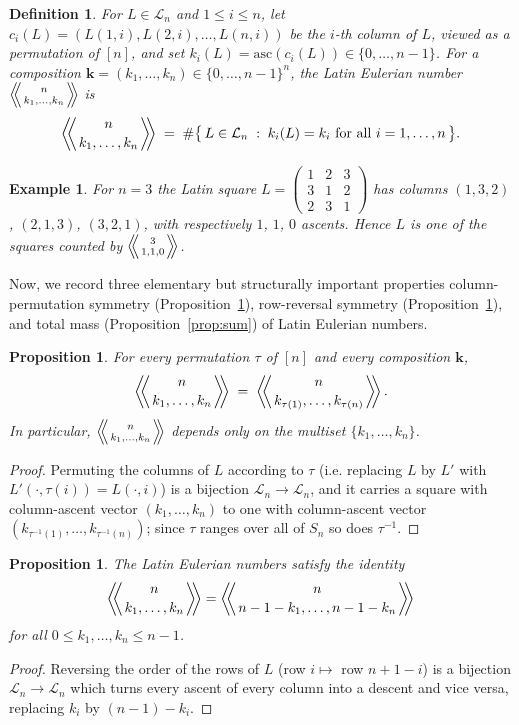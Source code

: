 \documentclass[11pt]{amsart}
\newtheorem{proposition}[theorem]{Proposition}
\newtheorem{definition}[theorem]{Definition}
\newtheorem{example}[theorem]{Example}
\newcommand{\LE}[1]{\left\langle\!\!\left\langle #1 \right\rangle\!\!\right\rangle}
\begin{document}
\begin{definition}\label{def:main}
For $L\in\mathcal L_n$ and $1\le i\le n$, let $c_i(L)=(L(1,i),L(2,i),\dots,L(n,i))$ be the $i$-th column of $L$, viewed as a permutation of $[n]$, and set $k_i(L)=\mathrm{asc}(c_i(L))\in\{0,\dots,n-1\}$. For a composition $\mathbf k=(k_1,\dots,k_n)\in\{0,\dots,n-1\}^n$, the \emph{Latin Eulerian number} $\LE{n\atop k_1,\dots,k_n}$ is
\[
\LE{n\atop k_1,\dots,k_n} \;=\; \#\bigl\{\,L\in\mathcal L_n \;:\; k_i(L)=k_i \text{ for all } i=1,\dots,n \,\bigr\}.
\]
\end{definition}

\begin{example}\label{ex:311}
For $n=3$ the Latin square $L=\begin{pmatrix}1&2&3\\3&1&2\\2&3&1\end{pmatrix}$
has columns $(1,3,2)$, $(2,1,3)$, $(3,2,1)$, with respectively $1$, $1$, $0$ ascents. Hence $L$ is one of the squares counted by $\LE{3\atop 1,1,0}$.
\end{example}
Now, we record three elementary but structurally important properties column-permutation symmetry (Proposition~\ref{prop:perm}), row-reversal symmetry (Proposition~\ref{prop:rev}), and total mass (Proposition~\ref{prop:sum}) of Latin Eulerian numbers. 
\begin{proposition}\label{prop:perm}
For every permutation $\tau$ of $[n]$ and every composition $\mathbf k$,
\[
\LE{n\atop k_1,\dots,k_n} \;=\; \LE{n\atop k_{\tau(1)},\dots,k_{\tau(n)}}.
\]
In particular, $\LE{n\atop k_1,\dots,k_n}$ depends only on the multiset $\{k_1,\dots,k_n\}$.
\end{proposition}
\begin{proof}
Permuting the columns of $L$ according to $\tau$ (i.e. replacing $L$ by $L'$ with $L'(\cdot,\tau(i))=L(\cdot,i)$) is a bijection $\mathcal L_n\to\mathcal L_n$, and it carries a square with column-ascent vector $(k_1,\dots,k_n)$ to one with column-ascent vector $(k_{\tau^{-1}(1)},\dots,k_{\tau^{-1}(n)})$; since $\tau$ ranges over all of $S_n$ so does $\tau^{-1}$.
\end{proof}

\begin{proposition}\label{prop:rev}
The Latin Eulerian numbers satisfy the identity
\[
\LE{n\atop k_1,\dots,k_n} = \LE{n\atop n-1-k_1,\dots,n-1-k_n}
\]
for all $0 \le k_1, \dots, k_n \le n-1$.
\end{proposition}
\begin{proof}
Reversing the order of the rows of $L$ (row $i\mapsto$ row $n+1-i$) is a bijection $\mathcal L_n\to\mathcal L_n$ which turns every ascent of every column into a descent and vice versa, replacing $k_i$ by $(n-1)-k_i$.
\end{proof}
\end{document}
